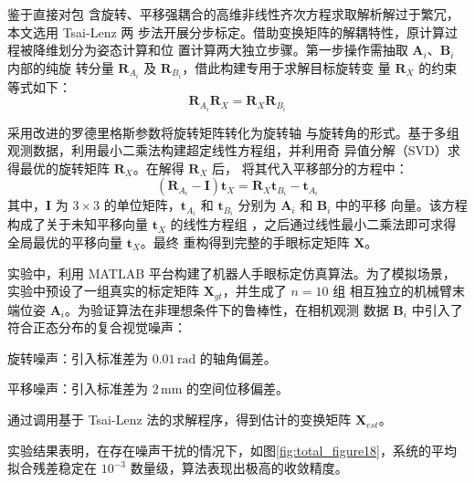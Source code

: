          鉴于直接对包
         含旋转、平移强耦合的高维非线性齐次方程求取解析解过于繁冗，本文选用 Tsai-Lenz 两
         步法开展分步标定。借助变换矩阵的解耦特性，原计算过程被降维划分为姿态计算和位
         置计算两大独立步骤。第一步操作需抽取 $\mathbf{A}_i$、$\mathbf{B}_i$ 内部的纯旋
         转分量 $\mathbf{R}_{A_i}$ 及 $\mathbf{R}_{B_i}$，借此构建专用于求解目标旋转变
         量 $\mathbf{R}_X$ 的约束等式如下：
    \begin{equation}
            \mathbf{R}_{A_i} \mathbf{R}_X = \mathbf{R}_X \mathbf{R}_{B_i}
        \end{equation}        

    采用改进的罗德里格斯参数将旋转矩阵转化为旋转轴
    与旋转角的形式。基于多组观测数据，利用最小二乘法构建超定线性方程组，并利用奇
    异值分解（SVD）求得最优的旋转矩阵 $\mathbf{R}_X$。在解得 $\mathbf{R}_X$ 后，
    将其代入平移部分的方程中：
    \begin{equation}
            (\mathbf{R}_{A_i} - \mathbf{I}) \mathbf{t}_X = \mathbf{R}_X \mathbf{t}_{B_i} - \mathbf{t}_{A_i}
        \end{equation}
            其中，$\mathbf{I}$ 为 $3 \times 3$ 的单位矩阵，$\mathbf{t}_{A_i}$ 和
     $\mathbf{t}_{B_i}$ 分别为 $\mathbf{A}_i$ 和 $\mathbf{B}_i$ 中的平移
     向量。该方程构成了关于未知平移向量 $\mathbf{t}_X$ 的线性方程组
     ，之后通过线性最小二乘法即可求得全局最优的平移向量 $\mathbf{t}_X$。最终
     重构得到完整的手眼标定矩阵 $\mathbf{X}$。

实验中，利用 MATLAB 平台构建了机器人手眼标定仿真算法。为了模拟场景，
实验中预设了一组真实的标定矩阵 $\mathbf{X}_{gt}$，并生成了 $n=10$ 组
相互独立的机械臂末端位姿 $\mathbf{A}_i$。为验证算法在非理想条件下的鲁棒性，在相机观测
数据 $\mathbf{B}_i$ 中引入了符合正态分布的复合视觉噪声：

旋转噪声：引入标准差为 $0.01 \, \text{rad}$ 的轴角偏差。

平移噪声：引入标准差为 $2 \, \text{mm}$ 的空间位移偏差。

通过调用基于 Tsai-Lenz 法的求解程序，得到估计的变换矩阵 $\mathbf{X}_{est}$。

实验结果表明，在存在噪声干扰的情况下，如图\ref{fig:total_figure18}，系统的平均拟合残差稳定在 $10^{-3}$ 数量级，算法表现出极高的收敛精度。

